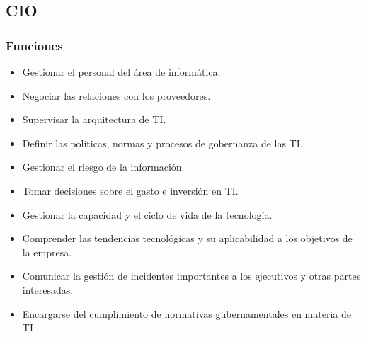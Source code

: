 
\subsection{CIO}
\subsubsection{Funciones}
    \begin{itemize}
        \item Gestionar el personal del área de informática. 
        \item Negociar las relaciones con los proveedores. 
        \item Supervisar la arquitectura de TI. 
        \item Definir las políticas, normas y procesos de gobernanza de las TI. 
        \item Gestionar el riesgo de la información. 
        \item Tomar decisiones sobre el gasto e inversión en TI. 
        \item Gestionar la capacidad y el ciclo de vida de la tecnología. 
        \item Comprender las tendencias tecnológicas y su aplicabilidad a los objetivos de la empresa. 
        \item Comunicar la gestión de incidentes importantes a los ejecutivos y otras partes interesadas. 
        \item Encargarse del cumplimiento de normativas gubernamentales en materia de TI 
    \end{itemize}
